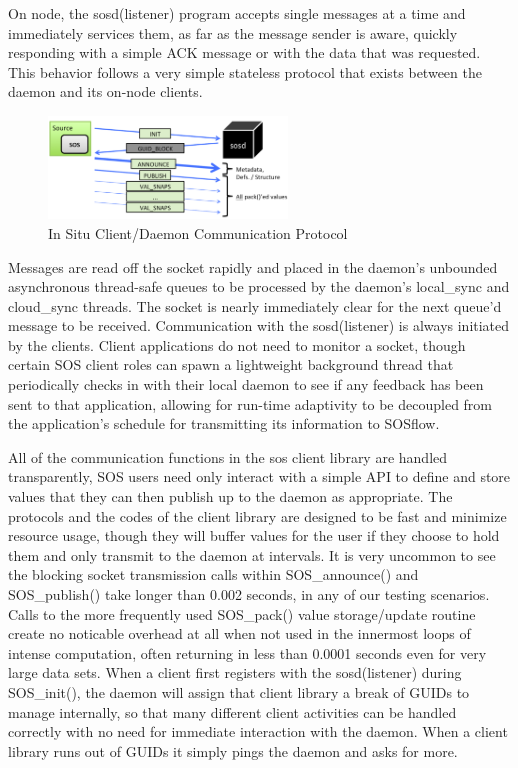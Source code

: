 On node, the sosd(listener) program accepts single messages at a time
and immediately services them, as far as the message sender is aware,
quickly responding with a simple ACK message or with the data that was
requested.  This behavior follows a very simple stateless protocol
that exists between the daemon and its on-node clients.

\begin{figure}[!t]
\centering
\includegraphics[width=2.5in]{images/sosd_protocol.png}
\caption{In Situ Client/Daemon Communication Protocol}
\label{fig_sim}
\end{figure}


Messages are read off the socket rapidly and placed in the daemon's
unbounded asynchronous thread-safe queues to be processed by the
daemon's local\_sync and cloud\_sync threads. The socket is nearly
immediately clear for the next queue'd message to be
received. Communication with the sosd(listener) is always initiated by
the clients.  Client applications do not need to monitor a socket,
though certain SOS client roles can spawn a lightweight background
thread that periodically checks in with their local daemon to see if
any feedback has been sent to that application, allowing for run-time
adaptivity to be decoupled from the application's schedule for
transmitting its information to SOSflow.

All of the communication functions in the sos client library are
handled transparently, SOS users need only interact with a simple API
to define and store values that they can then publish up to the daemon
as appropriate.  The protocols and the codes of the client library are
designed to be fast and minimize resource usage, though they will
buffer values for the user if they choose to hold them and only
transmit to the daemon at intervals.  It is very uncommon to see the
blocking socket transmission calls within SOS\_announce() and
SOS\_publish() take longer than 0.002 seconds, in any of our testing
scenarios. Calls to the more frequently used SOS\_pack() value storage/update
routine create no noticable overhead at all when not used in the
innermost loops of intense computation, often returning in less than
0.0001 seconds even for very large data sets. When a client first
registers with the sosd(listener) during SOS\_init(), the daemon will
assign that client library a break of GUIDs to manage internally, so
that many different client activities can be handled correctly with no
need for immediate interaction with the daemon. When a client library
runs out of GUIDs it simply pings the daemon and asks for more.

